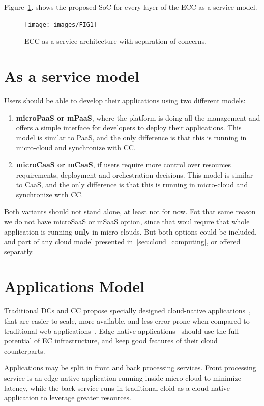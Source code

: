 Figure~\ref{fig:fig10}. shows the proposed SoC for every layer of the ECC as a service model.

\begin{figure}[H]
	\texttt{[image: images/FIG1]}
	\vspace{-0.7cm}
	\caption{ECC as a service architecture with separation of concerns.}
	\label{fig:fig10}
\end{figure}
%
%
\section{As a service model}\label{sec:as_a_service_model}
%
Users should be able to develop their applications using two different models:
 
\begin{enumerate}[start=1,label={(\bfseries \arabic*)}]
	\item \textbf{microPaaS or mPaaS}, where the platform is doing all the management and offers a simple interface for developers to deploy their applications. This model is similar to PaaS, and the only difference is that this is running in micro-cloud and synchronize with CC.
	\item \textbf{microCaaS or mCaaS}, if users require more control over resources requirements, deployment and orchestration decisions. This model is similar to CaaS, and the only difference is that this is running in micro-cloud and synchronize with CC.
\end{enumerate}

Both variants should not stand alone, at least not for now. Fot that same reason we do not have microSaaS or mSaaS option, since that woul requre that whole application is running \textbf{only} in micro-clouds. But both options could be included, and part of any cloud model presented in~\ref{sec:cloud_computing}, or offered separatly.
%
%
\section{Applications Model}\label{sec:application_model}
%
Traditional DCs and CC propose specially designed cloud-native applications~\cite{GannonBS17}, that are easier to scale, more available, and less error-prone when compared to traditional web applications~\cite{GannonBS17}. Edge-native applications~\cite{SatyanarayananK19} should use the full potential of EC infrastructure, and keep good features of their cloud counterparts. 

Applications may be split in front and back processing services. Front processing service is an edge-native application running inside micro cloud to minimize latency, while the back service runs in traditional cloid as a cloud-native application to leverage greater resources. 

